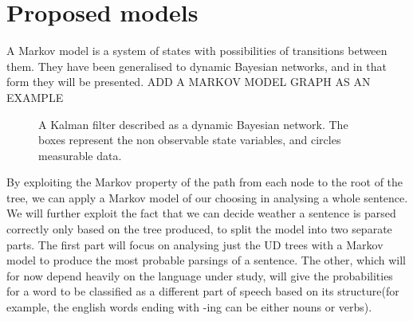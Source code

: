 \section{Proposed models}
A Markov model is a system of states with possibilities of transitions between them. They have been generalised to dynamic Bayesian networks, and in that form
they will be presented.
ADD A MARKOV MODEL GRAPH AS AN EXAMPLE
\begin{figure}[h!]
\center
{}
\label{kal}
\caption{A Kalman filter described as a dynamic Bayesian network. The boxes represent the non observable state variables, and circles measurable data.}
\end{figure}

By exploiting the Markov property of the path from each node to the root of the tree, we can apply a Markov model of our choosing in analysing a whole sentence.
We will further exploit the fact that we can decide weather a sentence is parsed correctly only based on the tree produced, to split the model into two separate
parts. The first part will focus on analysing just the UD trees with a Markov model to produce the most probable parsings of a sentence. The other, which will for now depend heavily on the language under study, will give the probabilities for a word to be classified as a different part of speech based on its structure(for example, the english words ending with -ing can be either nouns or verbs). 


\clearpage

